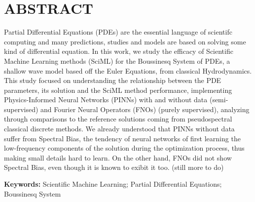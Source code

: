 \chapter*{ABSTRACT}
Partial Differential Equations (PDEs) are the essential language of scientifc computing and many predictions, 
studies and models are based on solving some kind of differential equation. In this work, we study the efficacy of 
Scientific Machine Learning methods (SciML) for the Boussinesq System of PDEs, a shallow wave model based off the Euler Equations, 
from classical Hydrodynamics. This study focused on understanding the relationship between the PDE parameters, its solution and the 
SciML method performance, implementing Physics-Informed Neural Networks (PINNs) with and without data (semi-supervised) and 
Fourier Neural Operators (FNOs) (purely supervised), analyzing through comparisons to the reference solutions coming from 
pseudospectral classical discrete methods. We already understood that PINNs without data suffer from Spectral Bias, the tendency 
of neural networks of first learning the low-frequency components of the solution during the optimization process, thus making 
small details hard to learn. On the other hand, FNOs did not show Spectral Bias, even though it is known to exibit it too. (still more to do)

\vspace{1cm}
\noindent
\textbf{Keywords:} Scientific Machine Learning; Partial Differential Equations; Boussinesq System

\pagebreak

\tableofcontents
\pagebreak


 

\printbibliography

